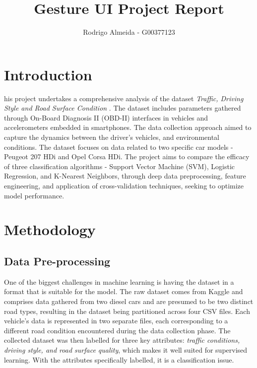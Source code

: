 \documentclass[10pt,journal,compsoc]{IEEEtran}
\begin{document}

\title{Gesture UI Project Report}

\author{Rodrigo Almeida - G00377123%
}

%
{}

\maketitle

\section{Introduction}
\label{sec:introduction}

his project undertakes a comprehensive analysis of the dataset \textit{Traffic, Driving Style and Road Surface Condition} \cite{dataset}. The dataset includes parameters gathered through On-Board Diagnosis II (OBD-II) interfaces in vehicles and accelerometers embedded in smartphones. The data collection approach aimed to capture the dynamics between the driver's vehicles, and environmental conditions. The dataset focuses on data related to two specific car models - Peugeot 207 HDi and Opel Corsa HDi.
The project aims to compare the efficacy of three classification algorithms - Support Vector Machine (SVM), Logistic Regression, and K-Nearest Neighbors, through deep data preprocessing, 
feature engineering, and application of cross-validation techniques, seeking to optimize model performance.


\section{Methodology}

\subsection{Data Pre-processing}

One of the biggest challenges in machine learning is having the dataset in a format that is suitable for the model. The raw dataset comes from Kaggle \cite{dataset} 
and comprises data gathered from two diesel cars and are presumed to be two distinct road types, resulting in the dataset being partitioned across four CSV files. 
Each vehicle's data is represented in two separate files, each corresponding to a different road condition encountered during the data collection phase. The collected dataset was then labelled for three key attributes: 
\textit{traffic conditions, driving style, and road surface quality}, which makes it well suited for supervised learning. With the attributes specifically labelled, it is a classification issue. 
\end{document}
